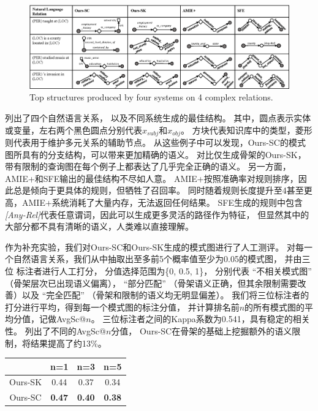 \begin{figure}[ht]
    \includegraphics[width=1.0\columnwidth]{figure/schema/case-crop.eps}
    \centering
    {Top structures produced by four systems on 4 complex relations.}
    \label{fig:schema-relation-example}
\end{figure}

列出了四个自然语言关系，
以及不同系统生成的最佳结构。
其中，圆点表示实体或变量，左右两个黑色圆点分别代表$x_{subj}$和$x_{obj}$。
方块代表知识库中的类型，菱形则代表用于维护多元关系的辅助节点。
从这些例子中可以发现，Ours-SC的模式图所具有的分支结构，可以带来更加精确的语义。
对比仅生成骨架的Ours-SK，带有限制的查询图在每个例子上都表达了几乎完全正确的语义。
另一方面，AMIE+和SFE输出的最佳结构不尽如人意。
AMIE+按照准确率对规则排序，因此总是倾向于更具体的规则，但牺牲了召回率。
同时随着规则长度提升至4甚至更高，AMIE+系统消耗了大量内存，无法返回任何结果。
SFE生成的规则中包含\textit{[Any-Rel]}代表任意谓词，因此可以生成更多灵活的路径作为特征，
但显然其中的大部分都不具有清晰的语义，人类难以直接理解。

作为补充实验，我们对Ours-SC和Ours-SK生成的模式图进行了人工测评。
对每一个自然语言关系，我们从中抽取出至多前5个概率值至少为0.05的模式图，
并由三位%
标注者进行人工打分，
分值选择范围为\{0, 0.5, 1\}，
分别代表 ``{不相关模式图}'' （骨架层次已出现语义偏离），
``{部分匹配}'' （骨架语义正确，但其余限制需要改善）以及
``{完全匹配}'' （骨架和限制的语义均无明显偏差）。
我们将三位标注者的打分进行平均，得到每一个模式图的标注分值，
并计算排名前$n$的所有模式图的平均分值，记做AvgSc@$n$。
三位标注者之间的Kappa系数为0.541，具有稳定的相关性。
列出了不同的AvgSc@$n$分值，
Ours-SC在骨架的基础上挖掘额外的语义限制，将结果提高了约13\%。

\begin{table}[ht]
	\centering
	\label{tab:average-score}
	\begin{tabular}{c|ccc}
		\hline
						&	n=1		&	n=3		&	n=5			\\
		\hline
		Ours-SK			&	0.44	&	0.37	&	0.34		\\
		Ours-SC			&	\textbf{0.47}	&	\textbf{0.40}	&	\textbf{0.38} \\
		\hline
	\end{tabular}
\end{table}


